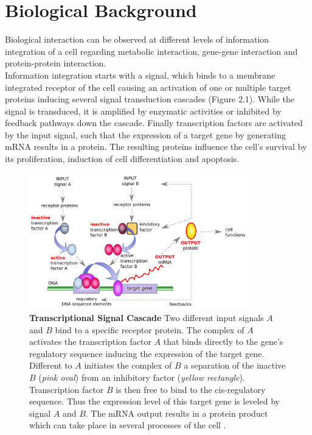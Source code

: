 \newpage
\section{Biological Background}
Biological interaction can be observed at different levels of information integration of a cell regarding metabolic interaction, gene-gene interaction and protein-protein interaction.\\ 
Information integration starts with a signal, which binds to a membrane integrated receptor of the cell causing an activation of one or multiple target proteins inducing several signal transduction cascades (Figure 2.1). While the signal is transduced, it is amplified by enzymatic activities or inhibited by feedback pathways down the cascade. Finally transcription factors are activated by the input signal, such that the expression of a target gene by generating mRNA results in a protein. The resulting proteins influence the cell's survival by its proliferation, induction of cell differentiation and apoptosis.


\begin{figure}[H]
\captionsetup{width=1.0\linewidth}
\centering
\includegraphics[width=0.85\textwidth]{./Bilder/GRN.pdf}
\caption[Transcriptional Signal Cascade]{\textbf{Transcriptional Signal Cascade}
Two different input signals $A$ and $B$ bind to a specific receptor protein. The complex of $A$ activates the transcription factor $A$ that binds directly to the gene's regulatory sequence inducing the expression of the target gene. Different to $A$ initiates the complex of $B$ a separation of the inactive $B$ (\textit{pink oval}) from an inhibitory factor (\textit{yellow rectangle}). Transcription factor $B$ is then free to bind to the cis-regulatory sequence. Thus the expression level of this target gene is leveled by signal $A$ and $B$. The mRNA output results in a protein product which can take place in several processes of the cell \citep{U.S.DepartmentofEnergyOfficeofScience.April2001}.}
\label{fig:Fig.2.}
\end{figure}



